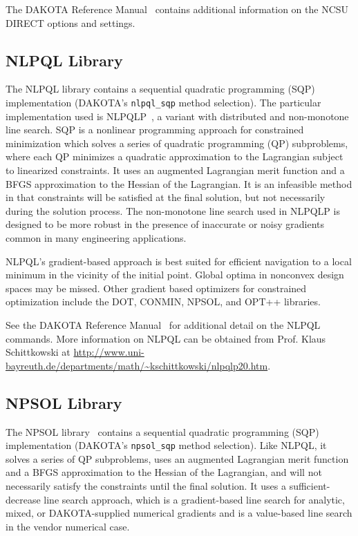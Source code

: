 The DAKOTA Reference Manual~\cite{RefMan} contains additional
information on the NCSU DIRECT options and settings.

\subsection{NLPQL Library}\label{opt:software:nlpql}

The NLPQL library contains a sequential quadratic programming (SQP)
implementation (DAKOTA's \texttt{nlpql\_sqp} method selection).  The
particular implementation used is NLPQLP~\cite{Sch04}, a variant with
distributed and non-monotone line search.  SQP is a nonlinear
programming approach for constrained minimization which solves a
series of quadratic programming (QP) subproblems, where each QP
minimizes a quadratic approximation to the Lagrangian subject to
linearized constraints. It uses an augmented Lagrangian merit function
and a BFGS approximation to the Hessian of the Lagrangian. It is an
infeasible method in that constraints will be satisfied at the final
solution, but not necessarily during the solution process.  The
non-monotone line search used in NLPQLP is designed to be more robust
in the presence of inaccurate or noisy gradients common in many
engineering applications.

NLPQL's gradient-based approach is best suited for efficient
navigation to a local minimum in the vicinity of the initial point.
Global optima in nonconvex design spaces may be missed. Other gradient
based optimizers for constrained optimization include the DOT, CONMIN,
NPSOL, and OPT++ libraries.

See the DAKOTA Reference Manual~\cite{RefMan} for additional detail on
the NLPQL commands. More information on NLPQL can be obtained from
Prof. Klaus Schittkowski at
\url{http://www.uni-bayreuth.de/departments/math/~kschittkowski/nlpqlp20.htm}.

\subsection{NPSOL Library}\label{opt:software:npsol}

The NPSOL library~\cite{Gil86} contains a sequential quadratic
programming (SQP) implementation (DAKOTA's \texttt{npsol\_sqp} method
selection).  Like NLPQL, it solves a series of QP subproblems, uses an
augmented Lagrangian merit function and a BFGS approximation to the
Hessian of the Lagrangian, and will not necessarily satisfy the
constraints until the final solution.  It uses a sufficient-decrease
line search approach, which is a gradient-based line search for
analytic, mixed, or DAKOTA-supplied numerical gradients and is a
value-based line search in the vendor numerical case.

